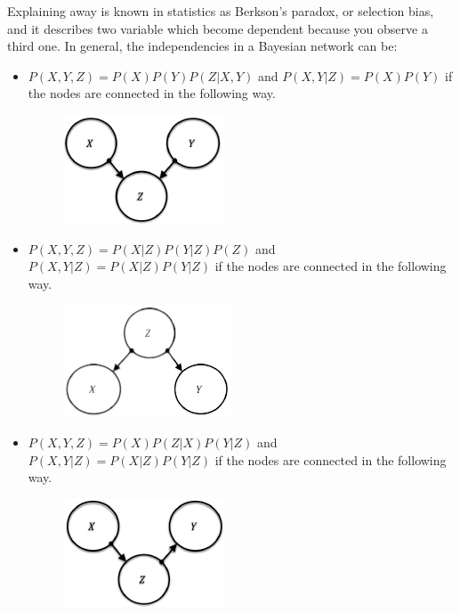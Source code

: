 \documentclass[12pt, a4paper]{report}
\newtheorem[style=M,bodystyle=\normalfont]{theorem}{Theorem}
\newtheorem[style=M,bodystyle=\normalfont]{corollary}{Corollary}
\newtheorem[style=M,bodystyle=\normalfont]{lemma}{Lemma}
\newtheorem[style=M,bodystyle=\normalfont]{definition}{Definition}
\begin{document}
    Explaining away is known in statistics as Berkson's paradox, or selection bias, and it describes two variable which become dependent 
    because you observe a third one. In general, the independencies in a Bayesian network can be: 
    \begin{itemize}
        \item $P(X,Y,Z)=P(X)P(Y)P(Z|X,Y)$ and $P(X,Y|Z)=P(X)P(Y)$ if the nodes are connected in the following way. 
            \begin{figure}[H]
                \centering
                \includegraphics[width=0.2\linewidth]{images/independencies1.png}
            \end{figure}
        \item $P(X,Y,Z)=P(X|Z)P(Y|Z)P(Z)$ and $P(X,Y|Z)=P(X|Z)P(Y|Z)$ if the nodes are connected in the following way. 
            \begin{figure}[H]
                \centering
                \includegraphics[width=0.2\linewidth]{images/independencies2.png}
            \end{figure}
        \item $P(X,Y,Z)=P(X)P(Z|X)P(Y|Z)$ and $P(X,Y|Z)=P(X|Z)P(Y|Z)$ if the nodes are connected in the following way. 
            \begin{figure}[H]
                \centering
                \includegraphics[width=0.2\linewidth]{images/independencies3.png}
            \end{figure}
    \end{itemize}
\end{document}
